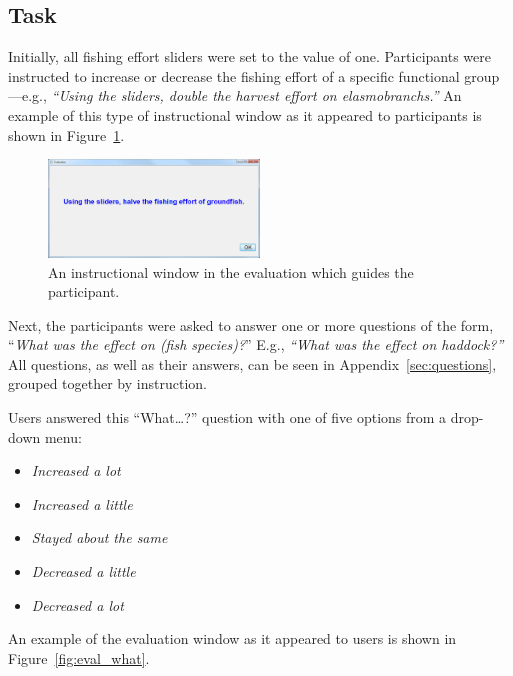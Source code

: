 \subsection{Task}

Initially, all fishing effort sliders were set to the value of one.  Participants were instructed to increase or decrease the fishing effort of a specific functional group---e.g., \textit{``Using the sliders, double the harvest effort on elasmobranchs.''}  An example of this type of instructional window as it appeared to participants is shown in Figure~\ref{fig:eval_inst}.

\begin{figure}[h]
	\centering
	\includegraphics[width=0.5\textwidth]{figures/png/eval_instr.png}
	\caption{An instructional window in the evaluation which guides the participant.}
	\label{fig:eval_inst}
\end{figure}

Next, the participants were asked to answer one or more questions of the form, ``\textit{What was the effect on (fish species)?}''  E.g., \textit{``What was the effect on haddock?''}  All questions, as well as their answers, can be seen in Appendix~\ref{sec:questions}, grouped together by instruction.  %

Users answered this ``What\ldots?'' question with one of five options from a drop-down menu:
\begin{itemize}
\item \textit{Increased a lot}
\item \textit{Increased a little}
\item \textit{Stayed about the same}
\item \textit{Decreased a little}
\item \textit{Decreased a lot}
\end{itemize}
An example of the evaluation window as it appeared to users is shown in Figure~\ref{fig:eval_what}.




